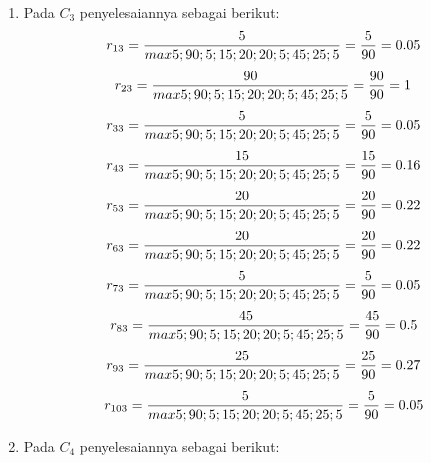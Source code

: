 \documentclass[a4paper,twoside]{article}
\begin{document}
\begin{enumerate}
\begin{enumerate}
\item Pada $C_{3}$ penyelesaiannya sebagai berikut:
\begin{displaymath}
r_{13} = \frac{5}{max {5;90;5;15;20;20;5;45;25;5}} = \frac{5}{90} = 0.05\\
\end {displaymath}
\begin{displaymath}
r_{23} = \frac{90}{max {5;90;5;15;20;20;5;45;25;5}} = \frac{90}{90} = 1\\
\end{displaymath}
\begin{displaymath}
r_{33} = \frac{5}{max {5;90;5;15;20;20;5;45;25;5}} = \frac{5}{90} = 0.05\\
\end {displaymath}
\begin{displaymath}
r_{43} = \frac{15}{max {5;90;5;15;20;20;5;45;25;5}} = \frac{15}{90} = 0.16\\
\end {displaymath}
\begin{displaymath}
r_{53} = \frac{20}{max {5;90;5;15;20;20;5;45;25;5}} = \frac{20}{90} = 0.22\\
\end {displaymath}
\begin{displaymath}
r_{63} = \frac{20}{max {5;90;5;15;20;20;5;45;25;5}} = \frac{20}{90} = 0.22\\
\end {displaymath}
\begin{displaymath}
r_{73} = \frac{5}{max {5;90;5;15;20;20;5;45;25;5}} = \frac{5}{90} = 0.05\\
\end {displaymath}
\begin{displaymath}
r_{83} = \frac{45}{max {5;90;5;15;20;20;5;45;25;5}} = \frac{45}{90} = 0.5\\
\end {displaymath}
\begin{displaymath}
r_{93} = \frac{25}{max {5;90;5;15;20;20;5;45;25;5}} = \frac{25}{90} = 0.27\\
\end {displaymath}
\begin{displaymath}
r_{103} = \frac{5}{max {5;90;5;15;20;20;5;45;25;5}} = \frac{5}{90} = 0.05\\
\end {displaymath}
\item Pada $C_{4}$ penyelesaiannya sebagai berikut:
\begin{displaymath}

\end{displaymath}
\end{enumerate}
\end{enumerate}
\end{document}
